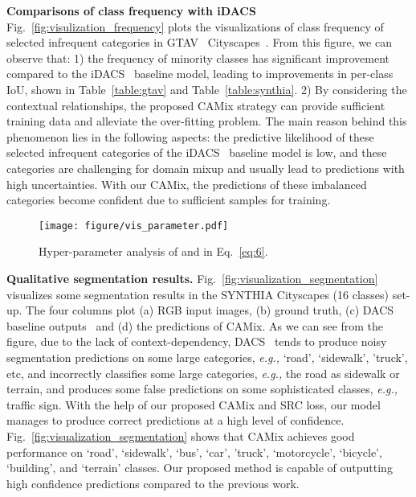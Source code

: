 \documentclass[journal]{IEEEtran}
\begin{document}
{\begin{minipage}{\textwidth}
\noindent \textbf{Comparisons of class frequency with iDACS~\cite{tranheden2020dacs}}
Fig.~\ref{fig:visulization_frequency} plots the visualizations of class frequency of selected infrequent categories in GTAV~\cite{stephan2016gtav}  Cityscapes~\cite{cordts2016cityscapes}.
From this figure, we can observe that: 1)
the frequency of minority classes has significant improvement compared to the iDACS~\cite{tranheden2020dacs} baseline model, leading to improvements in per-class IoU, shown in Table~\ref{table:gtav} and Table~\ref{table:synthia}. 2) 
By considering the contextual relationships, the proposed CAMix strategy can provide sufficient training data and alleviate the over-fitting problem. The main reason behind this phenomenon lies in  the following aspects:
the predictive likelihood of these selected infrequent categories of the iDACS~\cite{tranheden2020dacs} baseline model is low, and these categories are challenging for domain mixup and usually lead to predictions with high uncertainties. With our CAMix, the predictions of these imbalanced categories become confident due to sufficient samples for training. 


\begin{figure}[t]
\centering
\texttt{[image: figure/vis\_parameter.pdf]}
\caption{
Hyper-parameter analysis of  and  in Eq.~\ref{eq:6}.}

\label{fig:visulization_parameter}
\vspace{-5mm}
\end{figure}


\noindent \textbf{Qualitative segmentation results.}
Fig.~\ref{fig:visualization_segmentation} visualizes some segmentation results in the SYNTHIA  Cityscapes (16 classes) set-up. The four columns plot (a) RGB input images, (b) ground truth, (c) DACS baseline outputs~\cite{tranheden2020dacs} and (d) the predictions of CAMix.  As we can see from the figure, due to the lack of context-dependency, DACS~\cite{tranheden2020dacs} tends to produce noisy segmentation predictions on some large categories, \emph{e.g.,} ‘road’, ‘sidewalk’, 'truck', etc, and incorrectly classifies some large categories, \emph{e.g.,} the road as sidewalk or terrain, and produces some false predictions on some sophisticated classes, \emph{e.g.,} traffic sign. With the help of our proposed CAMix and SRC loss,  our model manages to produce correct predictions at a high level of confidence. Fig.~\ref{fig:visualization_segmentation} shows that CAMix achieves good performance on ‘road’, ‘sidewalk’, ‘bus’, ‘car’, 'truck', ‘motorcycle’, ‘bicycle’, ‘building’, and ‘terrain’ classes. Our proposed method is capable of outputting high confidence predictions compared to the previous work.


\end{minipage}}
\end{document}
